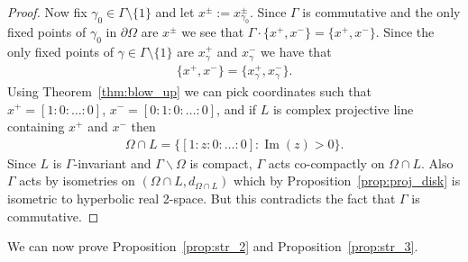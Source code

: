 \documentclass[12pt]{amsart}
\theoremstyle{plain}
\theoremstyle{definition}
\theoremstyle{remark}
\begin{document}
\begin{proof}
Now fix $\gamma_0 \in \Gamma \setminus \{1\}$ and let $x^\pm := x^\pm_{\gamma_0}$. Since $\Gamma$ is commutative and the only fixed points of $\gamma_0$ in $\partial \Omega$ are $x^{\pm}$ we see that $\Gamma \cdot \{x^+, x^-\} =  \{x^+, x^-\}$. Since the only fixed points of $\gamma \in \Gamma \setminus \{1\}$ are $x^+_{\gamma}$ and $x^-_{\gamma}$ we have that
\begin{align*}
\{x^+,x^-\}= \{x^+_{\gamma}, x^-_{\gamma} \}.
\end{align*}
Using Theorem~\ref{thm:blow_up} we can pick coordinates such that $x^+=[1:0:\dots:0]$, $x^-=[0:1:0:\dots:0]$, and if $L$ is complex projective line containing $x^+$ and $x^-$ then
\begin{align*}
\Omega \cap L = \{ [1:z:0:\dots:0] : \operatorname{Im}(z) >0\}.
\end{align*}
Since $L$ is $\Gamma$-invariant and $\Gamma \backslash \Omega$ is compact, $\Gamma$ acts co-compactly on $\Omega \cap L$. Also $\Gamma$ acts by isometries on $(\Omega \cap L, d_{\Omega \cap L})$ which by Proposition~\ref{prop:proj_disk} is isometric to hyperbolic real 2-space. But this contradicts the fact that $\Gamma$ is commutative.
\end{proof}

We can now prove Proposition~\ref{prop:str_2} and Proposition~\ref{prop:str_3}.
\end{document}
